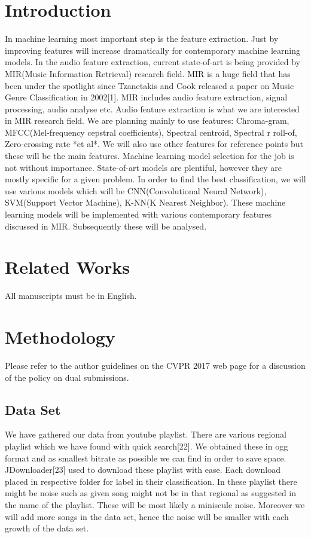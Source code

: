 \documentclass[10pt,twocolumn,letterpaper]{article}
\begin{document}
\section{Introduction}
In machine learning most important step is the feature extraction. Just by improving features will increase dramatically for contemporary machine learning models. In the audio feature extraction, current state-of-art is being provided by MIR(Music Information Retrieval) research field. MIR is a huge field that has been under the spotlight since Tzanetakis and Cook released a paper on Music Genre Classification in 2002[1]. MIR includes audio feature extraction, signal processing, audio analyse etc. Audio feature extraction is what we are interested in MIR research field. We are planning mainly to use features: Chroma-gram, MFCC(Mel-frequency cepstral coefficients), Spectral centroid, Spectral r	roll-of, Zero-crossing rate *et al*. We will also use other features for reference points but these will be the main features. 
Machine learning model selection for the job is not without importance. State-of-art models are plentiful, however they are mostly specific for a given problem. In order to find the best classification, we will use various models which will be CNN(Convolutional Neural Network), SVM(Support Vector Machine), K-NN(K Nearest Neighbor). These machine learning models will be implemented with various contemporary features discussed in MIR. Subsequently these will be analysed.   

\section{Related Works}

All manuscripts must be in English.

\section{Methodology}

Please refer to the author guidelines on the CVPR 2017 web page for a
discussion of the policy on dual submissions.

\subsection{Data Set}
We have gathered our data from youtube playlist. There are various regional playlist which we have found with quick search[22]. We obtained these in ogg format and as smallest bitrate as possible we can find in order to save space. JDownloader[23] used to download these playlist with ease. Each download placed in respective folder for label in their classification. In these playlist there might be noise such as given song might not be in that regional as suggested in the name of the playlist. These will be most likely a miniscule noise. Moreover we will add more songs in the data set, hence the noise will be smaller with each growth of the data set. 
\end{document}
